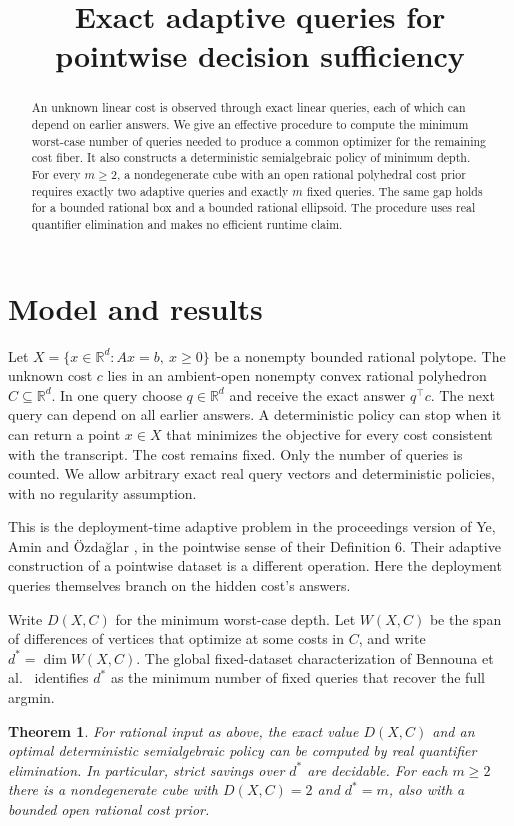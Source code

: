 \documentclass[11pt,a4paper]{amsart}
\title[Exact adaptive queries for pointwise sufficiency]{Exact adaptive queries for pointwise decision sufficiency}
\date{}
\newtheorem{theorem}{Theorem}
\newcommand{\R}{\mathbb R}
\begin{document}
\begin{abstract}
An unknown linear cost is observed through exact linear queries, each of which can depend on earlier answers. We give an effective procedure to compute the minimum worst-case number of queries needed to produce a common optimizer for the remaining cost fiber. It also constructs a deterministic semialgebraic policy of minimum depth. For every $m\geq2$, a nondegenerate cube with an open rational polyhedral cost prior requires exactly two adaptive queries and exactly $m$ fixed queries. The same gap holds for a bounded rational box and a bounded rational ellipsoid. The procedure uses real quantifier elimination and makes no efficient runtime claim.
\end{abstract}
\maketitle

\section{Model and results}
Let $X=\{x\in\R^d:Ax=b,\ x\geq0\}$ be a nonempty bounded rational polytope. The unknown cost $c$ lies in an ambient-open nonempty convex rational polyhedron $C\subseteq\R^d$. In one query choose $q\in\R^d$ and receive the exact answer $q^\top c$. The next query can depend on all earlier answers. A deterministic policy can stop when it can return a point $x\in X$ that minimizes the objective for every cost consistent with the transcript. The cost remains fixed. Only the number of queries is counted. We allow arbitrary exact real query vectors and deterministic policies, with no regularity assumption.

This is the deployment-time adaptive problem in the proceedings version of Ye, Amin and \"Ozda\u{g}lar \cite[\S7, p.~13]{ye}, in the pointwise sense of their Definition 6. Their adaptive construction of a pointwise dataset is a different operation. Here the deployment queries themselves branch on the hidden cost's answers.

Write $D(X,C)$ for the minimum worst-case depth. Let $W(X,C)$ be the span of differences of vertices that optimize at some costs in $C$, and write $d^*=\dim W(X,C)$. The global fixed-dataset characterization of Bennouna et al.\ \cite[Corollary 1]{bennouna} identifies $d^*$ as the minimum number of fixed queries that recover the full argmin.

\begin{theorem}
For rational input as above, the exact value $D(X,C)$ and an optimal deterministic semialgebraic policy can be computed by real quantifier elimination. In particular, strict savings over $d^*$ are decidable. For each $m\geq2$ there is a nondegenerate cube with $D(X,C)=2$ and $d^*=m$, also with a bounded open rational cost prior.
\end{theorem}
\end{document}
